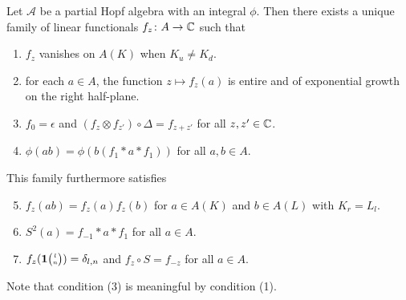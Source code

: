 \begin{Theorem} \label{thm:rep-characters} Let $\mathscr{A}$ be a
  partial Hopf algebra with an integral $\phi$.  Then there exists a unique
  family of linear functionals $f_{z} \colon A\to \mathbb{C}$ such that
\begin{enumerate}[label={(\arabic*)}]
  \item $f_z$ vanishes on $A(K)$ when $K_u\neq K_d$.
  \item for each $a\in A$, the function $z\mapsto f_{z}(a)$ is entire
    and of exponential growth on the right half-plane.
  \item $f_{0} = \epsilon$ and $(f_{z} \otimes f_{z'}) \circ 
    \Delta= f_{z+z'}$ for all $z,z' \in \mathbb{C}$.
  \item $\phi(ab)=\phi(b(f_{1} \ast a \ast f_{1}))$ for all $a,b\in A$.
  \end{enumerate}
  This family furthermore satisfies
  \begin{enumerate}[label={(\arabic*)}]\setcounter{enumi}{4}
  \item $f_z(ab) = f_z(a)f_z(b)$ for $a\in A(K)$ and $b\in A(L)$ with $K_r = L_l$. 
  \item $S^{2}(a)=f_{-1} \ast a \ast f_{1}$ for all $a\in A$.
  \item $f_{z}(\mathbf{1}{\tiny {\begin{pmatrix} l\\n\end{pmatrix}}})=\delta_{l,n}$ and $f_{z} \circ S = f_{-z}$ for all $a\in A$.
\end{enumerate}
\end{Theorem}


Note that condition (3) is meaningful by condition (1).


